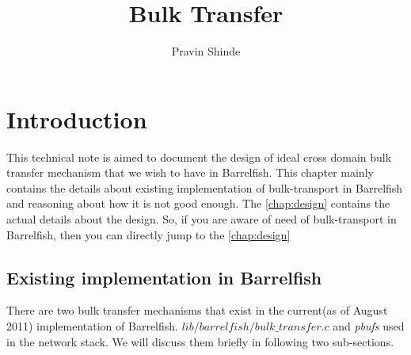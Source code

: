 \documentclass[a4paper,twoside]{report} %
\title{Bulk Transfer}   %
\author{Pravin Shinde} %
\begin{document}
\maketitle

%
%
\begin{versionhistory}
\end{versionhistory}


\chapter{Introduction}
\label{chap:intro}
This technical note is aimed to document the design of ideal cross domain bulk
transfer mechanism that we wish to have in Barrelfish.  This chapter
mainly contains the details about existing implementation of
bulk-transport in Barrelfish and reasoning about how it is not good
enough.  The \autoref{chap:design} contains the actual
details about the design.  So, if you are aware of need of
bulk-transport in Barrelfish, then you can directly jump to the 
\autoref{chap:design}


\section{Existing implementation in Barrelfish}
There are two bulk transfer mechanisms that exist in the current(as of August
2011) implementation of Barrelfish.
\texttt{$lib/barrelfish/bulk\_transfer.c$}
and \textit{pbufs} used in the network stack.  We will discuss them briefly in
following two sub-sections.
\end{document}
